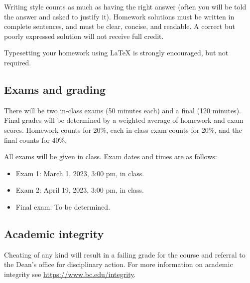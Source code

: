 \documentclass[11pt,oneside]{amsart}
\begin{document}
Writing style counts as much as having the right answer (often you will be told the answer and asked to justify it). Homework solutions must be written in complete sentences, and must be clear, concise, and readable. A correct but poorly expressed solution will not receive full credit.

Typesetting your homework using LaTeX is strongly encouraged, but not required.

\subsection*{Exams and grading}
There will be two in-class exams (50 minutes each) and a final (120 minutes). Final grades will be determined by a weighted average of homework and exam scores.  Homework counts for 20\%, each in-class exam counts for 20\%, and the final counts for 40\%.

All exams will be given in class. Exam dates and times are as follows:
\begin{itemize}
  \item Exam 1: March 1, 2023, 3:00 pm, in class.
  \item Exam 2: April 19, 2023, 3:00 pm, in class.
  \item Final exam: To be determined.
\end{itemize}

\subsection*{Academic integrity}
Cheating of any kind will result in a failing grade for the course and referral to the Dean’s office for disciplinary action.  For more information on academic integrity see \url{https://www.bc.edu/integrity}.
\end{document}
